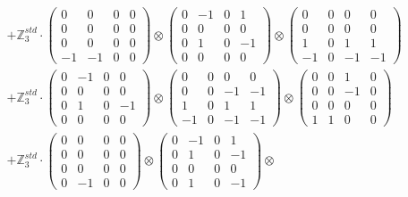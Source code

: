 \documentclass{article}
\begin{document}
{\begin{align}
        &+ \label{Rs16-Rc11-Solution-5-c22} \mathbb{Z}_3^{std} \cdot 
            \begin{pmatrix} 0 & 0 & 0 & 0 \\ 0 & 0 & 0 & 0 \\ 0 & 0 & 0 & 0 \\ -1 & -1 & 0 & 0 \end{pmatrix} \otimes 
            \begin{pmatrix} 0 & -1 & 0 & 1 \\ 0 & 0 & 0 & 0 \\ 0 & 1 & 0 & -1 \\ 0 & 0 & 0 & 0 \end{pmatrix} \otimes 
            \begin{pmatrix} 0 & 0 & 0 & 0 \\ 0 & 0 & 0 & 0 \\ 1 & 0 & 1 & 1 \\ -1 & 0 & -1 & -1 \end{pmatrix} \\ 
        &+ \label{Rs16-Rc11-Solution-5-c23} \mathbb{Z}_3^{std} \cdot 
            \begin{pmatrix} 0 & -1 & 0 & 0 \\ 0 & 0 & 0 & 0 \\ 0 & 1 & 0 & -1 \\ 0 & 0 & 0 & 0 \end{pmatrix} \otimes 
            \begin{pmatrix} 0 & 0 & 0 & 0 \\ 0 & 0 & -1 & -1 \\ 1 & 0 & 1 & 1 \\ -1 & 0 & -1 & -1 \end{pmatrix} \otimes 
            \begin{pmatrix} 0 & 0 & 1 & 0 \\ 0 & 0 & -1 & 0 \\ 0 & 0 & 0 & 0 \\ 1 & 1 & 0 & 0 \end{pmatrix} \\ 
        &+ \label{Rs16-Rc11-Solution-5-c24} \mathbb{Z}_3^{std} \cdot 
            \begin{pmatrix} 0 & 0 & 0 & 0 \\ 0 & 0 & 0 & 0 \\ 0 & 0 & 0 & 0 \\ 0 & -1 & 0 & 0 \end{pmatrix} \otimes 
            \begin{pmatrix} 0 & -1 & 0 & 1 \\ 0 & 1 & 0 & -1 \\ 0 & 0 & 0 & 0 \\ 0 & 1 & 0 & -1 \end{pmatrix} \otimes 

\end{align}}
\end{document}
